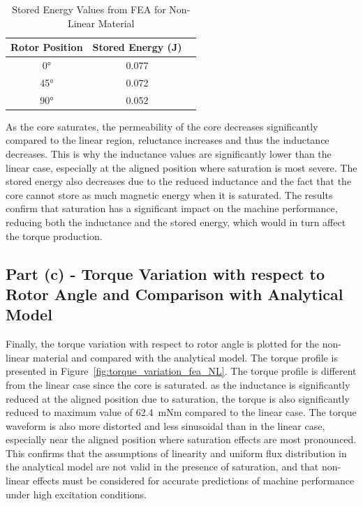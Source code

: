 \documentclass[12pt, a4paper]{article}
\begin{document}
\begin{table}[htbp]
    \centering
    \caption{Stored Energy Values from FEA for Non-Linear Material}
    \label{tab:energy_fea_NL}
    \begin{tabular}{|c|c|c|}
        \hline
        Rotor Position & Stored Energy (J) \\
        \hline
        0° & 0.077 \\
        45° & 0.072 \\
        90° & 0.052 \\
        \hline
    \end{tabular}
\end{table}

As the core saturates, the permeability of the core decreases significantly compared to the linear region, reluctance increases and thus the inductance decreases. This is why the inductance values are significantly lower than the linear case, especially at the aligned position where saturation is most severe. The stored energy also decreases due to the reduced inductance and the fact that the core cannot store as much magnetic energy when it is saturated. The results confirm that saturation has a significant impact on the machine performance, reducing both the inductance and the stored energy, which would in turn affect the torque production.

\subsection{Part (c) - Torque Variation with respect to Rotor Angle and Comparison with Analytical Model}

Finally, the torque variation with respect to rotor angle is plotted for the non-linear material and compared with the analytical model. The torque profile is presented in Figure~\ref{fig:torque_variation_fea_NL}. The torque profile is different from the linear case since the core is saturated. as the inductance is significantly reduced at the aligned position due to saturation, the torque is also significantly reduced to maximum value of \SI{62.4}{mNm} compared to the linear case. The torque waveform is also more distorted and less sinusoidal than in the linear case, especially near the aligned position where saturation effects are most pronounced. This confirms that the assumptions of linearity and uniform flux distribution in the analytical model are not valid in the presence of saturation, and that non-linear effects must be considered for accurate predictions of machine performance under high excitation conditions.
\end{document}
